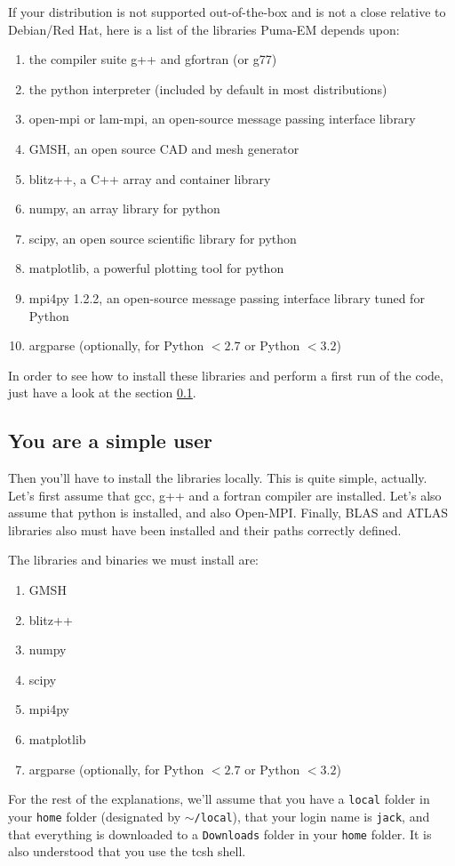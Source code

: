 \documentclass[a4paper,10pt]{book}
\begin{document}
\par
If your distribution is not supported out-of-the-box and is not a close relative to Debian/Red Hat, here is a list of the libraries Puma-EM depends upon:
\begin{enumerate}
\item the compiler suite g++ and gfortran (or g77)
\item the python interpreter (included by default in most distributions)
\item open-mpi or lam-mpi, an open-source message passing interface library
\item GMSH, an open source CAD and mesh generator
\item blitz++, a C++ array and container library
\item numpy, an array library for python
\item scipy, an open source scientific library for python
\item matplotlib, a powerful plotting tool for python
\item mpi4py 1.2.2, an open-source message passing interface library tuned for Python
\item argparse (optionally, for Python $< 2.7$ or Python $< 3.2$)
\end{enumerate}
%
\par
In order to see how to install these libraries and perform a first run of the code, just have a look at the section \ref{subsec:simple_user}.


\subsection{You are a simple user}
\label{subsec:simple_user}
%
\par
Then you'll have to install the libraries locally. This is quite simple, actually. Let's first assume that gcc, g++ and a fortran compiler are installed. Let's also assume that python is installed, and also Open-MPI. Finally, BLAS and ATLAS libraries also must have been installed and their paths correctly defined.
%
\par
The libraries and binaries we must install are:
\begin{enumerate}
\item GMSH
\item blitz++
\item numpy
\item scipy
\item mpi4py
\item matplotlib
\item argparse (optionally, for Python $< 2.7$ or Python $< 3.2$)
\end{enumerate}
%
\par
For the rest of the explanations, we'll assume that you have a \texttt{local} folder in your \texttt{home} folder (designated by \texttt{$\sim$/local}), that your login name is \texttt{jack}, and that everything is downloaded to a \texttt{Downloads} folder in your \texttt{home} folder. It is also understood that you use the tcsh shell.
\end{document}
